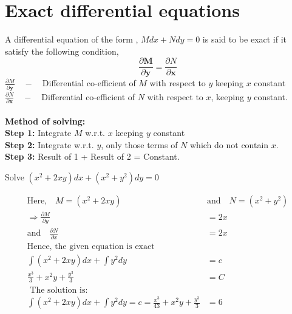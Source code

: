 \section{Exact differential equations}
A differential equation of the form , $Mdx+Ndy=0$ is said to be  exact if it satisfy the following condition,$$\frac{\partial \boldsymbol{M}}{\partial \boldsymbol{y}}=\frac{\partial N}{\partial \boldsymbol{x}}$$
$\frac{\partial M}{\partial \boldsymbol{y}}\quad-\quad$Differential co-efficient of $M$ with respect to $y$ keeping $x$ constant\\
$\frac{\partial N}{\partial \boldsymbol{x}}\quad-\quad$Differential co-efficient of $N$ with respect to $x$, keeping $y$ constant.\\\\
\textbf{\large Method of solving:}\\
\textbf{Step 1:} Integrate $M$ w.r.t. $x$ keeping $y$ constant\\
\textbf{Step 2:} Integrate w.r.t. $y$, only those terms of $N$ which do not contain $x$.\\ \textbf{Step 3:} Result of 1 + Result of 2 = Constant.
\begin{exercise}
	Solve $\left(x^{2}+2 x y\right) d x+\left(x^{2}+y^{2}\right) d y=0$
\end{exercise}
\begin{answer}
	\begin{align*}
	\text{Here,}\quad M=\left(x^{2}+2 x y\right) \quad &\text{and}\quad N=\left(x^{2}+y^{2}\right)\\\Rightarrow \frac{\partial M}{\partial y}&=2 x\\\text{and}\quad
	\frac{\partial N}{\partial x}&=2 x\\
	\text{Hence, the given equation is exact}\\
	\int\left(x^{2}+2 x y\right) d x+\int y^{2} d y&=c\\\frac{x^{3}}{3}+x^{2} y+\frac{y^{3}}{3}&=C\\\text { The solution is: } \\\int\left(x^{2}+2 x y\right) d x+\int y^{2} d y=c=\frac{x^{3}}{43}+x^{2} y+\frac{y^{3}}{3}&=6\end{align*}
\end{answer}
